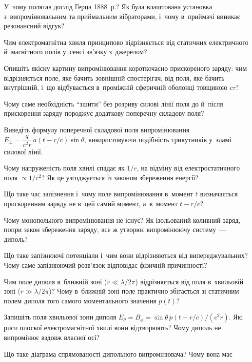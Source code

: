 \begin{Questions}
\begin{quizlist}
	\item У~чому полягав дослід Герца 1888~р.? Як була влаштована установка
	  з~випромінювальним та приймальним вібраторами, і~чому в~приймачі виникає резонансний
	  відгук?
	\item Чим електромагнітна хвиля принципово відрізняється від статичних електричного
	  й~магнітного полів у~сенсі зв'язку з~джерелом?
	\item Опишіть якісну картину випромінювання короткочасно прискореного заряду: чим
	  відрізняється поле, яке бачить зовнішній спостерігач, від поля, яке бачить
	  внутрішній, і~що відбувається в~проміжній сферичній оболонці товщиною $c\tau$?
	\item Чому саме необхідність \enquote{зшити} без розриву силові лінії поля до й~після
	  прискорення заряду породжує додаткову поперечну складову поля?
	\item Виведіть формулу поперечної складової поля випромінювання $E_\perp =
	  \dfrac{q}{c^2r}\,a(t-r/c)\sin\theta$, використовуючи подібність трикутників у~зламі
	  силової лінії.
	\item Чому напруженість поля хвилі спадає як $1/r$, на відміну від електростатичного
	  поля $\propto1/r^2$? Як це узгоджується із законом збереження енергії?
	\item Що таке час запізнення і~чому поле випромінювання в~момент $t$ визначається
	  прискоренням заряду не в~цей самий момент, а~в~момент $t-r/c$?
	\item Чому монопольного випромінювання не існує? Як ізольований коливний заряд, попри
	  закон збереження заряду, все ж утворює випромінюючу систему~--- диполь?
	\item Що таке запізнюючі потенціали і~чим вони відрізняються від випереджувальних?
	  Чому саме запізнюючий розв'язок відповідає фізичній причинності?
	\item Чим поле диполя в~ближній зоні ($r\ll\lambda/2\pi$) відрізняється від поля
	  в~хвильовій зоні ($r\gg\lambda/2\pi$)? Чому в~ближній зоні поле практично збігається
	  зі статичним полем диполя того самого моментального значення $p(t)$?
	\item Запишіть поля хвильової зони диполя $E_\theta=B_\phi=\sin\theta\,\ddot{p}(t-r/c)/(c^2r)$. Які риси плоскої електромагнітної хвилі вони відтворюють? Чому
	  диполь не випромінює вздовж власної осі?
	\item Що таке діаграма спрямованості дипольного випромінювача? Чому вона має

\end{quizlist}
\end{Questions}
